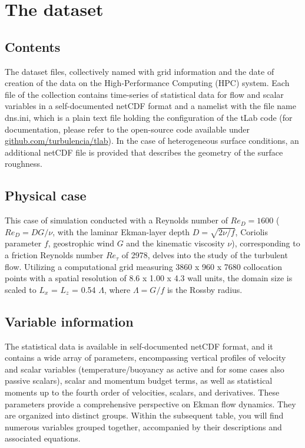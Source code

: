 \documentclass[11pt]{article}
\begin{document}
\section{The dataset}

\subsection{Contents}

The dataset files, collectively named with grid information and the date of creation of the data on the High-Performance Computing (HPC) system. Each file of the collection contains time-series of statistical data for flow and scalar variables in a self-documented netCDF format and a namelist with the file name dns.ini, which is a plain text file holding the configuration of the tLab code (for documentation, please refer to the open-source code available under \url{github.com/turbulencia/tlab}). In the case of heterogeneous surface conditions, an additional netCDF file is provided that describes the geometry of the surface roughness.
\subsection{Physical case}

This case of simulation conducted with a Reynolds number of $Re_D=1600$ ($Re_D=DG/\nu$, with the laminar Ekman-layer depth $D=\sqrt{2\nu/ f}$, Coriolis parameter $f$, geostrophic wind $G$ and the kinematic viscosity $\nu$), corresponding to a friction Reynolds number \(Re_{\tau}\) of 2978, delves into the study of the turbulent flow. Utilizing a computational grid measuring 3860 x 960 x 7680 collocation points with a spatial resolution of 8.6 x 1.00 x 4.3  wall units, the domain size is scaled to \(L_x\) = \(L_z\) = 0.54 \(\Lambda\), where \(\Lambda=G/f\) is the Rossby radius.\\

\subsection{Variable information}

The statistical data is available in self-documented netCDF format, and it contains a wide array of parameters, encompassing vertical profiles of velocity and scalar variables (temperature/buoyancy as active and for some cases also passive scalars), scalar and momentum budget terms, as well as statistical moments up to the fourth order of velocities, scalars, and derivatives. These parameters provide a comprehensive perspective on Ekman flow dynamics. They are organized into distinct groups. Within the subsequent table, you will find numerous variables grouped together, accompanied by their descriptions and associated equations.
\end{document}
